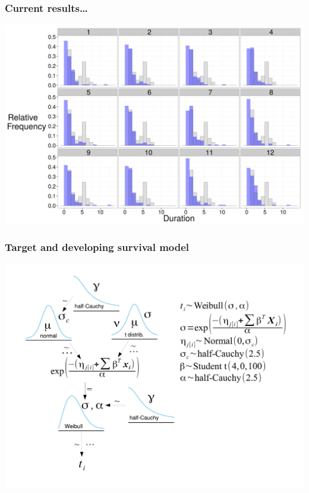 \documentclass{beamer}
\begin{document}
\begin{frame}
  \frametitle{Current results\dots}
  \begin{center}
    \includegraphics[height = 0.8\textheight, width = \textwidth,  keepaspectratio = true]{figure/brac_dur_post}
  \end{center}
\end{frame}

\begin{frame}
  \frametitle{Target and developing survival model}
  \begin{center}
    \includegraphics[height = 0.8\textheight, width = \textwidth,  keepaspectratio = true]{figure/brac_surv_mod_update}
  \end{center}
\end{frame}
\end{document}
